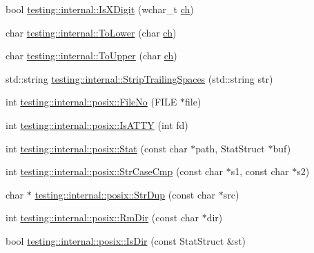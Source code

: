 \begin{DoxyCompactItemize}
bool \mbox{\hyperlink{namespacetesting_1_1internal_a6ab68a30f8291c09b2289c132bbe3b16}{testing\+::internal\+::\+Is\+X\+Digit}} (wchar\+\_\+t \mbox{\hyperlink{_obj__test_2lib_2googletest-master_2googlemock_2test_2gmock-matchers__test_8cc_af53f92900705f7de3c139a05b2f9ef16}{ch}})
\item 
char \mbox{\hyperlink{namespacetesting_1_1internal_ad9c627ef2a94245e3fd69e7ab3d49b42}{testing\+::internal\+::\+To\+Lower}} (char \mbox{\hyperlink{_obj__test_2lib_2googletest-master_2googlemock_2test_2gmock-matchers__test_8cc_af53f92900705f7de3c139a05b2f9ef16}{ch}})
\item 
char \mbox{\hyperlink{namespacetesting_1_1internal_ac1b876a8133895bd553d4780ecaa1e3a}{testing\+::internal\+::\+To\+Upper}} (char \mbox{\hyperlink{_obj__test_2lib_2googletest-master_2googlemock_2test_2gmock-matchers__test_8cc_af53f92900705f7de3c139a05b2f9ef16}{ch}})
\item 
std\+::string \mbox{\hyperlink{namespacetesting_1_1internal_aa6afda12e567c353e2e9b9c2e8cae14f}{testing\+::internal\+::\+Strip\+Trailing\+Spaces}} (std\+::string str)
\item 
int \mbox{\hyperlink{namespacetesting_1_1internal_1_1posix_a3117b067e1f942a2031e666953120ccc}{testing\+::internal\+::posix\+::\+File\+No}} (F\+I\+LE $\ast$file)
\item 
int \mbox{\hyperlink{namespacetesting_1_1internal_1_1posix_a16ebe936b3a8ea462a94191635aedc27}{testing\+::internal\+::posix\+::\+Is\+A\+T\+TY}} (int fd)
\item 
int \mbox{\hyperlink{namespacetesting_1_1internal_1_1posix_a2b87b7ff647a128614daf50667eb9304}{testing\+::internal\+::posix\+::\+Stat}} (const char $\ast$path, Stat\+Struct $\ast$buf)
\item 
int \mbox{\hyperlink{namespacetesting_1_1internal_1_1posix_a1ef2385a7f8e4c706054da35967e76bd}{testing\+::internal\+::posix\+::\+Str\+Case\+Cmp}} (const char $\ast$s1, const char $\ast$s2)
\item 
char $\ast$ \mbox{\hyperlink{namespacetesting_1_1internal_1_1posix_a5c0864ea9d81d27332b9133e35cbc43c}{testing\+::internal\+::posix\+::\+Str\+Dup}} (const char $\ast$src)
\item 
int \mbox{\hyperlink{namespacetesting_1_1internal_1_1posix_acbad5d4ea5b73fd1765f5f760642932a}{testing\+::internal\+::posix\+::\+Rm\+Dir}} (const char $\ast$dir)
\item 
bool \mbox{\hyperlink{namespacetesting_1_1internal_1_1posix_af0d04ed5baeed28353fa38742748a421}{testing\+::internal\+::posix\+::\+Is\+Dir}} (const Stat\+Struct \&st)

\end{DoxyCompactItemize}

